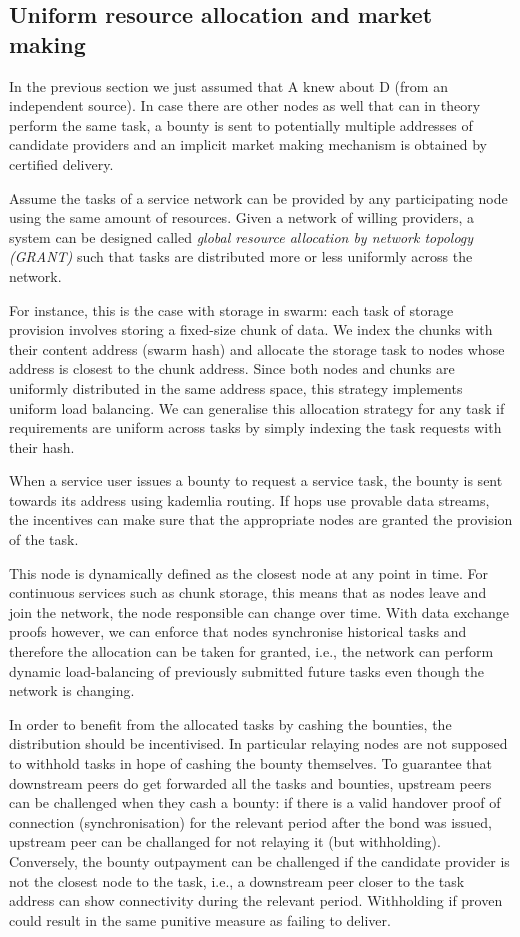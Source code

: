 \documentclass[a4paper,10pt]{article}
\newcommand\gloss[1]{\emph{\gls{#1}}}
\begin{document}
\subsection{Uniform resource allocation and market making}

In the previous section we just assumed that A knew about D (from an independent source).
In case there are other nodes as well that can in theory perform the same task,
a bounty is sent to potentially multiple addresses of candidate providers
and an implicit market making mechanism is obtained by certified delivery.

Assume the tasks of a service network can be provided by any participating node using
the same amount of resources. Given a network of willing providers, a system can be designed
called \gloss{global resource allocation by network topology (GRANT)}
such that tasks are distributed more or less uniformly across the network.

For instance, this is the case with storage in swarm:
each task of storage provision involves storing a fixed-size chunk of data.
We index the chunks with their content address (swarm hash) and allocate the storage task
to nodes whose address is closest to the chunk address.
Since both nodes and chunks are uniformly distributed in the same address space,
this strategy implements uniform load balancing. We can generalise this allocation
strategy for any task if requirements
are uniform across tasks by simply indexing the task requests with their hash.

When a service user issues a bounty to request a service task, the bounty
is sent towards its address using kademlia routing.
If hops use provable data streams, the incentives can make sure
that the appropriate nodes are granted the provision of the task.

This node is dynamically defined as the closest node at any point in time.
For continuous services such as chunk storage, this means that as nodes leave
and join the network, the node responsible can change over time.
With data exchange proofs however, we can enforce that nodes synchronise historical
tasks and therefore the allocation can be taken for granted, i.e., the network
can perform dynamic load-balancing of previously submitted future tasks even though
the network is changing.

In order to benefit from the allocated tasks by cashing the bounties, the distribution
should be incentivised. In particular relaying nodes are not supposed to withhold
tasks in hope of cashing the bounty themselves.
To guarantee that downstream peers do get forwarded all the tasks and bounties,
upstream peers can be challenged when they cash a bounty:
if there is a valid handover proof of connection (synchronisation)
for the relevant period after the bond was issued, upstream peer can be challanged
for not relaying it (but withholding). Conversely, the bounty outpayment can be challenged
if the candidate provider is not the closest node to the task, i.e., a downstream peer closer to
the task address can show connectivity during the relevant period. Withholding if proven could
result in the same punitive measure as failing to deliver.
\end{document}
